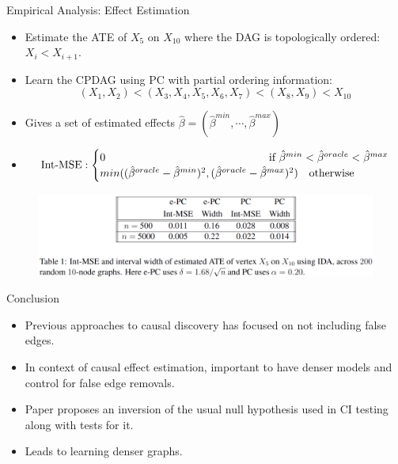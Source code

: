 \documentclass{beamer}
\begin{document}
\begin{frame}{Empirical Analysis: Effect Estimation}
	\begin{itemize}
		\item Estimate the ATE of $ X_5 $ on $ X_{10} $ where the DAG is topologically ordered: $ X_i < X_{i+1} $.
		\item Learn the CPDAG using PC with partial ordering information:
			$$ (X_1, X_2) < (X_3, X_4, X_5, X_6, X_7) < (X_8, X_9) < X_{10} $$
		\item Gives a set of estimated effects $ \hat{\beta} = (\hat{\beta}^{min}, \cdots, \hat{\beta}^{max}) $
		\item $$ \textnormal{Int-MSE}:  \begin{cases}
				0 & \!\!\!\!\!\!\!\!\!\!\!\!\!\!\!\!\!\!\!\!\!\! \textnormal{if } \hat{\beta}^{min} < \hat{\beta}^{oracle} < \hat{\beta}^{max} \\
				min((\hat{\beta}^{oracle} - \hat{\beta}^{min})^2, (\hat{\beta}^{oracle} - \hat{\beta}^{max})^2) & \textnormal{otherwise} \\
						\end{cases} $$
	\end{itemize}
	\begin{figure}
		\centering
		\includegraphics[scale=0.35]{imgs/table1.png}
	\end{figure}
\end{frame}

\begin{frame}{Conclusion}
	\begin{itemize}
		\item Previous approaches to causal discovery has focused on not including false edges.
		\item In context of causal effect estimation, important to have denser models and control for false edge removals.
		\item Paper proposes an inversion of the usual null hypothesis used in CI testing along with tests for it.
		\item Leads to learning denser graphs.
	\end{itemize}
\end{frame}
\end{document}
